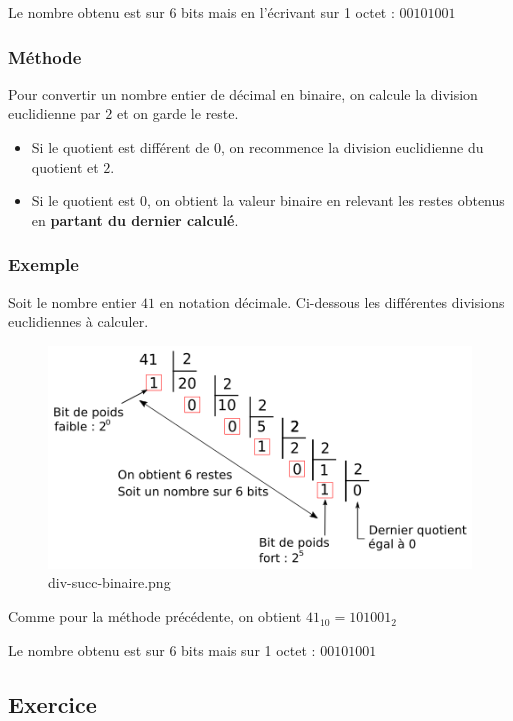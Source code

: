 \documentclass[11pt]{article}
\providecommand{\tightlist}{%
      \setlength{\itemsep}{0pt}\setlength{\parskip}{0pt}}
\begin{document}
Le nombre obtenu est sur 6 bits mais en l'écrivant sur 1 octet :
\(00101001\)

\hypertarget{muxe9thode-1}{%
\subsubsection*{Méthode}\label{muxe9thode-1}}

Pour convertir un nombre entier de décimal en binaire, on calcule la
division euclidienne par \(2\) et on garde le reste.

\begin{itemize}
\tightlist
\item
  Si le quotient est différent de \(0\), on recommence la division
  euclidienne du quotient et \(2\).
\item
  Si le quotient est \(0\), on obtient la valeur binaire en relevant les
  restes obtenus en \textbf{partant du dernier calculé}.
\end{itemize}

\hypertarget{exemple-1}{%
\subsubsection*{Exemple}\label{exemple-1}}

Soit le nombre entier \(41\) en notation décimale. Ci-dessous les
différentes divisions euclidiennes à calculer.

\begin{figure}
\centering
\includegraphics{img/div-succ-binaire.png}
\caption{div-succ-binaire.png}
\end{figure}

Comme pour la méthode précédente, on obtient \(41_{10}=101001_{2}\)

Le nombre obtenu est sur 6 bits mais sur 1 octet : \(00101001\)

    \hypertarget{exercice}{%
\subsection{Exercice}\label{exercice}}
\end{document}
